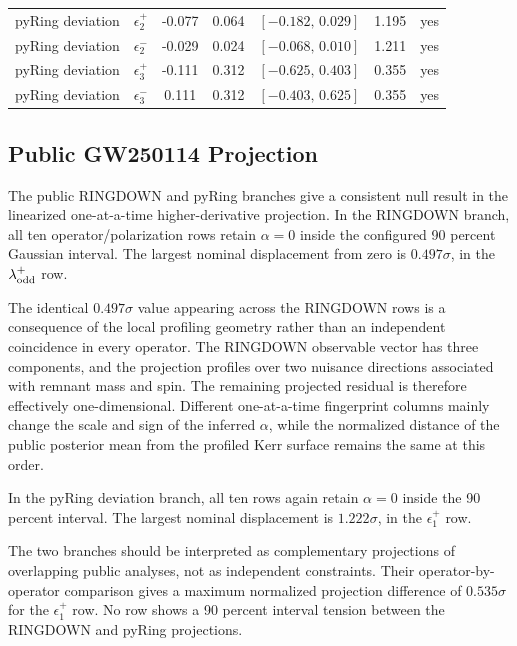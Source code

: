 \documentclass[aps,prd,10pt,twocolumn,nofootinbib,superscriptaddress]{revtex4-2}
\begin{document}
\begin{table}
\begin{ruledtabular}
\begin{tabular}{llccccc}
pyRing deviation & $\epsilon_2^{+}$ & -0.077 & 0.064 & $[-0.182,\,0.029]$ & 1.195 & yes \\
pyRing deviation & $\epsilon_2^{-}$ & -0.029 & 0.024 & $[-0.068,\,0.010]$ & 1.211 & yes \\
pyRing deviation & $\epsilon_3^{+}$ & -0.111 & 0.312 & $[-0.625,\,0.403]$ & 0.355 & yes \\
pyRing deviation & $\epsilon_3^{-}$ & 0.111 & 0.312 & $[-0.403,\,0.625]$ & 0.355 & yes \\
\end{tabular}
\end{ruledtabular}
\end{table}

\subsection{Public GW250114 Projection}

The public RINGDOWN and pyRing branches give a consistent null result in the
linearized one-at-a-time higher-derivative projection. In the RINGDOWN branch,
all ten operator/polarization rows retain $\alpha=0$ inside the configured
90 percent Gaussian interval. The largest nominal displacement from zero is
$0.497\sigma$, in the $\lambda_{\rm odd}^{+}$ row.

The identical $0.497\sigma$ value appearing across the RINGDOWN rows is a
consequence of the local profiling geometry rather than an independent
coincidence in every operator. The RINGDOWN observable vector has three
components, and the projection profiles over two nuisance directions
associated with remnant mass and spin. The remaining projected residual is
therefore effectively one-dimensional. Different one-at-a-time fingerprint
columns mainly change the scale and sign of the inferred $\alpha$, while the
normalized distance of the public posterior mean from the profiled Kerr
surface remains the same at this order.

In the pyRing deviation branch, all ten rows again retain $\alpha=0$ inside
the 90 percent interval. The largest nominal displacement is $1.222\sigma$, in
the $\epsilon_1^{+}$ row.

The two branches should be interpreted as complementary projections of
overlapping public analyses, not as independent constraints. Their
operator-by-operator comparison gives a maximum normalized projection
difference of $0.535\sigma$ for the $\epsilon_1^{+}$ row. No row shows a
90 percent interval tension between the RINGDOWN and pyRing projections.
\end{document}
